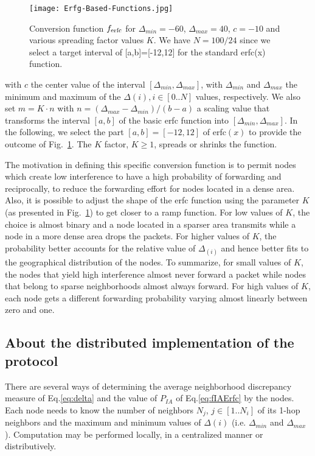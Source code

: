 \documentclass[journal, peerreview, onecolumn, draftcls]{IEEEtran}
\begin{document}
\begin{figure}
\centering
  \texttt{[image: Erfg-Based-Functions.jpg]}
    \caption{Conversion function $f_{\rm erfc}$ for $\Delta_{min}=-60$, $\Delta_{max}=40$, $c=-10$ and various spreading factor values $K$. We have $N=100/24$ since we select a target interval of [a,b]=[-12,12] for the standard erfc(x) function.}
    \label{fig:fIAErfc}
\end{figure}

with $c$ the center value of the interval $[\Delta_{min}, \Delta_{max}]$, with $\Delta_{min}$ and $\Delta_{max}$ the minimum and maximum of the $\Delta(i), i\in[0..N]$ values, respectively. We also set $m=K \cdot n$ with $n = (\Delta_{max}-\Delta_{min})/(b-a)$ a scaling value that transforms the interval $[a,b]$ of the basic erfc function into $[\Delta_{min}, \Delta_{max}]$. In the following, we select the part $[a,b] = [-12,12]$ of erfc$(x)$ to provide the outcome of Fig.~\ref{fig:fIAErfc}. The $K$ factor, $K\geq1$, spreads or shrinks the function.

The motivation in defining this specific conversion function is to permit nodes which create low interference to have a high probability of forwarding and reciprocally, to reduce the forwarding effort for nodes located in a dense area. Also, it is possible to adjust the shape of the erfc function using the parameter $K$ (as presented in Fig.~\ref{fig:fIAErfc}) to get closer to a ramp function. For low values of $K$, the choice is almost binary and a node located in a sparser area transmits while a node in a more dense area drops the packets. For higher values of $K$, the probability better accounts for the relative value of $\Delta_(i)$ and hence better fits to the geographical distribution of the nodes.
To summarize, for small values of $K$, the nodes that yield high interference almost never forward a packet while nodes that belong to sparse neighborhoods almost always forward. For high values of $K$, each node gets a different forwarding probability varying almost linearly between zero and one.

\subsection{About the distributed implementation of the protocol}

There are several ways of determining the average neighborhood discrepancy measure of Eq.\ref{eq:delta} and the value of $P_{IA}$ of Eq.\ref{eq:fIAErfc} by the nodes. Each node needs to know the number of neighbors $N_j$, $j\in[1..N_i]$ of its 1-hop neighbors and the maximum and minimum values of $\Delta(i)$ (i.e. $\Delta_{min}$ and $\Delta_{max}$). Computation may be performed locally, in a centralized manner or distributively.
\end{document}
